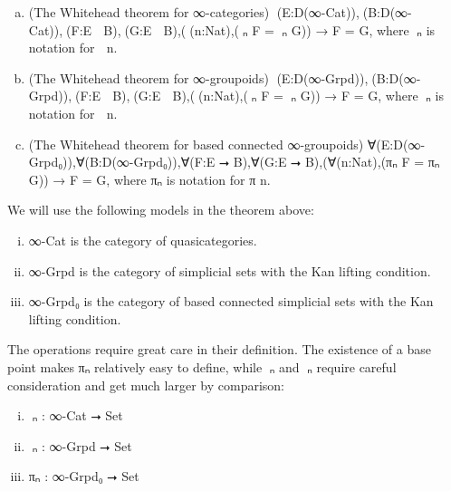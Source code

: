 \documentclass{book}
\theoremstyle{definition}
\begin{document}
\begin{enumerate}[(a)]
\item (The Whitehead theorem for ∞-categories) ∀(E:D⃗(∞-Cat)),∀(B:D⃗(∞-Cat)),∀(F:E ⭢ B),∀(G:E ⭢ B),(∀(n:Nat),(π⃗ₙ F = π⃗ₙ G)) → F = G, where π⃗ₙ is notation for π⃗ n.
\item (The Whitehead theorem for ∞-groupoids) ∀(E:D⃡(∞-Grpd)),∀(B:D⃡(∞-Grpd)),∀(F:E ⭢ B),∀(G:E ⭢ B),(∀(n:Nat),(π⃡ₙ F = π⃡ₙ G)) → F = G, where π⃡ₙ is notation for π⃡ n.
\item (The Whitehead theorem for based connected ∞-groupoids) ∀(E:D(∞-Grpd₀)),∀(B:D(∞-Grpd₀)),∀(F:E ⭢ B),∀(G:E ⭢ B),(∀(n:Nat),(πₙ F = πₙ G)) → F = G, where πₙ is notation for π n.
\end{enumerate}

We will use the following models in the theorem above:

\begin{enumerate}[(i)]
\item ∞-Cat is the category of quasicategories.
\item ∞-Grpd is the category of simplicial sets with the Kan lifting condition.
\item ∞-Grpd₀ is the category of based connected simplicial sets with the Kan lifting condition.
\end{enumerate}

The operations require great care in their definition. The existence of a base point makes πₙ relatively easy to define, while π⃗ₙ and π⃡ₙ require careful consideration and get much larger by comparison:

\begin{enumerate}[(i)]
\item π⃗ₙ : ∞-Cat ⭢ Set
\item π⃡ₙ : ∞-Grpd ⭢ Set
\item πₙ : ∞-Grpd₀ ⭢ Set
\end{enumerate}
\end{document}
